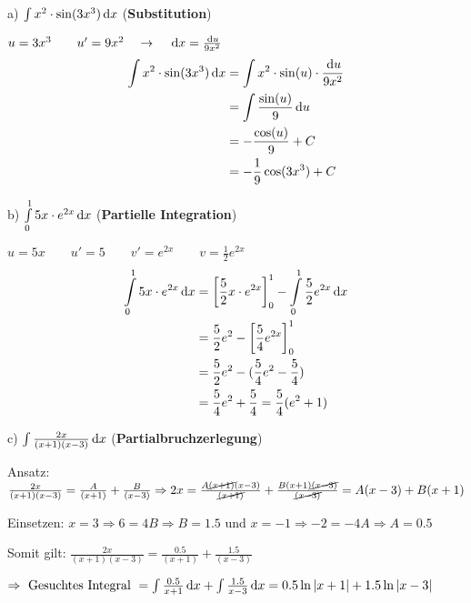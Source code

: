 


\begin{multicols}{2}
    a) $\int x^2 \cdot \sin(3x^3) \,\mathrm{d}x$ (\textbf{Substitution})

    $u = 3x^3 \quad \quad u' = 9x^2 \quad \rightarrow \quad \,\mathrm{d}x = \frac{\,\mathrm{d}u}{9x^2}$
    \begin{align*}
        \int x^2 \cdot \sin(3x^3) \,\mathrm{d}x &= \int x^2 \cdot \sin(u) \cdot \frac{\,\mathrm{d}u}{9x^2} \\
        &= \int \frac{\sin(u)}{9} \,\mathrm{d}u \\
        &= - \frac{\cos(u)}{9} + C \\
        &= - \frac{1}{9} \cos(3x^3) + C
    \end{align*}

    \columnbreak

    b) $\int \limits_{0}^{1} 5x \cdot e^{2x} \,\mathrm{d}x$ (\textbf{Partielle Integration})

    $u = 5x \quad\quad u' = 5 \quad\quad v' = e^{2x} \quad\quad v = \frac{1}{2} e^{2x}$
    \begin{align*}
        \int \limits_{0}^{1} 5x \cdot e^{2x} \,\mathrm{d}x &= \left[ \frac{5}{2} x \cdot e^{2x} \right]_{0}^{1} - \int \limits_{0}^{1} \frac{5}{2} e^{2x} \,\mathrm{d}x \\
        &= \frac{5}{2} e^2 - \left[ \frac{5}{4} e^{2x} \right]_{0}^{1} \\
        &= \frac{5}{2} e^2 - (\frac{5}{4} e^2 - \frac{5}{4}) \\
        &= \frac{5}{4} e^2 + \frac{5}{4} = \frac{5}{4} (e^2 + 1)
    \end{align*}
\end{multicols}

c) $\int \frac{2x}{(x + 1)(x - 3)} \,\mathrm{d}x$ (\textbf{Partialbruchzerlegung})

Ansatz: $\frac{2x}{(x + 1)(x - 3)} = \frac{A}{(x + 1)} + \frac{B}{(x - 3)} \Rightarrow 2x = \frac{A\cancel{(x+1)}(x-3)}{\cancel{(x+1)}} + \frac{B(x+1)\cancel{(x-3)}}{\cancel{(x-3)}} = A(x-3) + B(x+1)$

Einsetzen: $x = 3 \Rightarrow 6 = 4B \Rightarrow B = 1.5$ und $x = -1 \Rightarrow -2 = -4A \Rightarrow A = 0.5$

Somit gilt: $\frac{2x}{(x+1)(x-3)} = \frac{0.5}{(x+1)} + \frac{1.5}{(x-3)}$

$\Rightarrow \text{ Gesuchtes Integral } = \int \frac{0.5}{x + 1} \,\mathrm{d}x + \int \frac{1.5}{x - 3} \,\mathrm{d}x = 0.5 \ln|x + 1| + 1.5 \ln|x - 3| $

